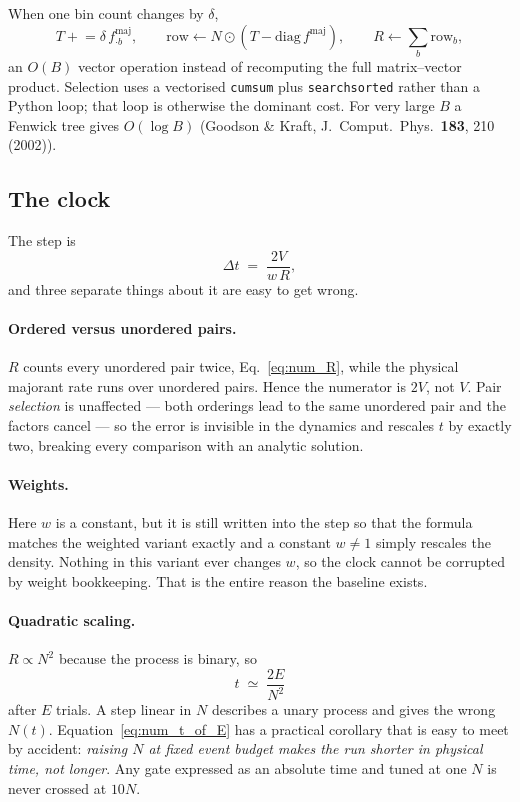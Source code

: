 \documentclass[a4paper,12pt]{article}
\newcommand{\fmaj}{f^{\mathrm{maj}}}
\newcommand{\code}[1]{\texttt{#1}}
\begin{document}
When one bin count changes by $\delta$,
\[
  T \mathrel{+}= \delta\, \fmaj_{\cdot b},
  \qquad
  \text{row} \gets N \odot (T - \mathrm{diag}\,\fmaj),
  \qquad
  R \gets \textstyle\sum_b \text{row}_b ,
\]
an $O(B)$ vector operation instead of recomputing the full matrix--vector
product. Selection uses a vectorised \code{cumsum} plus \code{searchsorted}
rather than a Python loop; that loop is otherwise the dominant cost. For
very large $B$ a Fenwick tree gives $O(\log B)$ (Goodson \& Kraft,
J.~Comput.\ Phys.\ \textbf{183}, 210 (2002)).

\subsection{The clock}
\label{sec:trick5}

The step is
\begin{equation}
  \Delta t \;=\; \frac{2V}{w\,R},
  \label{eq:num_clock}
\end{equation}
and three separate things about it are easy to get wrong.

\paragraph{Ordered versus unordered pairs.}
$R$ counts every unordered pair twice, Eq.~\eqref{eq:num_R}, while the
physical majorant rate runs over unordered pairs. Hence the numerator is
$2V$, not $V$. Pair \emph{selection} is unaffected --- both orderings lead to
the same unordered pair and the factors cancel --- so the error is invisible
in the dynamics and rescales $t$ by exactly two, breaking every comparison
with an analytic solution.

\paragraph{Weights.}
Here $w$ is a constant, but it is still written into the step so that the
formula matches the weighted variant exactly and a constant $w \neq 1$ simply
rescales the density. Nothing in this variant ever changes $w$, so the clock
cannot be corrupted by weight bookkeeping. That is the entire reason the
baseline exists.

\paragraph{Quadratic scaling.}
$R \propto N^2$ because the process is binary, so
\begin{equation}
  t \;\simeq\; \frac{2E}{N^2}
  \label{eq:num_t_of_E}
\end{equation}
after $E$ trials. A step linear in $N$ describes a unary process and gives
the wrong $N(t)$. Equation~\eqref{eq:num_t_of_E} has a practical corollary
that is easy to meet by accident: \emph{raising $N$ at fixed event budget
makes the run shorter in physical time, not longer}. Any gate expressed as an
absolute time and tuned at one $N$ is never crossed at $10N$.
\end{document}
